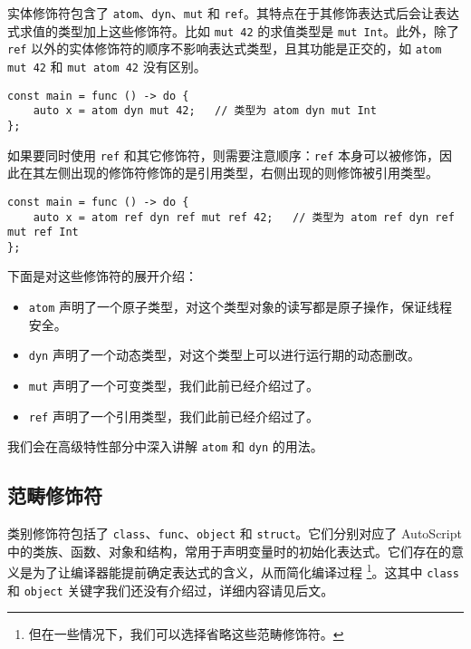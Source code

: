 实体修饰符包含了 \lstinline!atom!、\lstinline!dyn!、\lstinline!mut! 和 \lstinline!ref!。其特点在于其修饰表达式后会让表达式求值的类型加上这些修饰符。比如 \lstinline!mut 42! 的求值类型是 \lstinline!mut Int!。此外，除了 \lstinline!ref! 以外的实体修饰符的顺序不影响表达式类型，且其功能是正交的，如 \lstinline!atom mut 42! 和 \lstinline!mut atom 42! 没有区别。

\begin{lstlisting}
const main = func () -> do {
    auto x = atom dyn mut 42;   // 类型为 atom dyn mut Int
};
\end{lstlisting}

如果要同时使用 \lstinline!ref! 和其它修饰符，则需要注意顺序：\lstinline!ref! 本身可以被修饰，因此在其左侧出现的修饰符修饰的是引用类型，右侧出现的则修饰被引用类型。

\begin{lstlisting}
const main = func () -> do {
    auto x = atom ref dyn ref mut ref 42;   // 类型为 atom ref dyn ref mut ref Int
};
\end{lstlisting}

下面是对这些修饰符的展开介绍：

\begin{itemize}
	\item \lstinline!atom! 声明了一个原子类型，对这个类型对象的读写都是原子操作，保证线程安全。
	
	\item \lstinline!dyn! 声明了一个动态类型，对这个类型上可以进行运行期的动态删改。
	
	\item \lstinline!mut! 声明了一个可变类型，我们此前已经介绍过了。
	
	\item \lstinline!ref! 声明了一个引用类型，我们此前已经介绍过了。
\end{itemize}

我们会在高级特性部分中深入讲解 \lstinline!atom! 和 \lstinline!dyn! 的用法。

\subsection{范畴修饰符}

类别修饰符包括了 \lstinline!class!、\lstinline!func!、\lstinline!object! 和 \lstinline!struct!。它们分别对应了 AutoScript 中的类族、函数、对象和结构，常用于声明变量时的初始化表达式。它们存在的意义是为了让编译器能提前确定表达式的含义，从而简化编译过程 \footnote{但在一些情况下，我们可以选择省略这些范畴修饰符。}。这其中 \lstinline!class! 和 \lstinline!object! 关键字我们还没有介绍过，详细内容请见后文。

